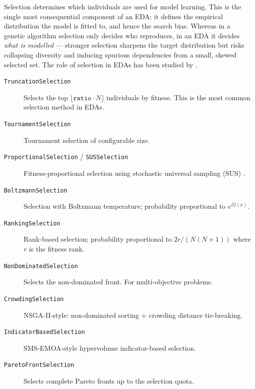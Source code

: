 \documentclass[a4paper,11pt]{article}
\begin{document}
Selection determines which individuals are used for model learning. This is the
single most consequential component of an EDA: it defines the empirical
distribution the model is fitted to, and hence the search bias. Whereas in a
genetic algorithm selection only decides who reproduces, in an EDA it decides
\emph{what is modelled} --- stronger selection sharpens the target distribution
but risks collapsing diversity and inducing spurious dependencies from a small,
skewed selected set. The role of selection in EDAs has been studied by
\citet{Johnson_and_Shapiro:2002,Lima_et_al:2007,Mahnig_and_Muehlenbein:2001,Santana_et_al:2005b}.

\begin{description}
  \item[\texttt{TruncationSelection}]
    Selects the top $\lfloor \texttt{ratio} \cdot N \rfloor$ individuals by
    fitness.  This is the most common selection method in EDAs.

  \item[\texttt{TournamentSelection}]
    Tournament selection of configurable size.

  \item[\texttt{ProportionalSelection} / \texttt{SUSSelection}]
    Fitness-proportional selection using stochastic universal sampling (SUS)
    \citep{Baker:1987}.

  \item[\texttt{BoltzmannSelection}]
    Selection with Boltzmann temperature; probability proportional to
    $e^{\beta f(x)}$.

  \item[\texttt{RankingSelection}]
    Rank-based selection; probability proportional to $2r/(N(N+1))$ where
    $r$ is the fitness rank.

  \item[\texttt{NonDominatedSelection}]
    Selects the non-dominated front.  For multi-objective problems.

  \item[\texttt{CrowdingSelection}]
    NSGA-II-style: non-dominated sorting + crowding distance tie-breaking.

  \item[\texttt{IndicatorBasedSelection}]
    SMS-EMOA-style hypervolume indicator-based selection.

  \item[\texttt{ParetoFrontSelection}]
    Selects complete Pareto fronts up to the selection quota.
\end{description}
\end{document}

